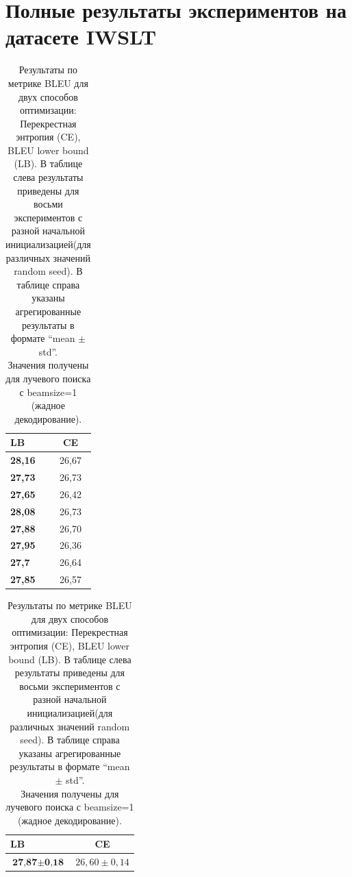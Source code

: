 \documentclass[14pt, a4paper]{extarticle}
\begin{document}
\section{Полные результаты экспериментов на датасете IWSLT}
\begin{table}[!htbp]
\begin{tabular}{| l  c |}
\hline \bf LB & \bf CE\\
\hline
\bf 28,16 & 26,67\\
\bf 27,73 & 26,73\\
\bf 27,65 & 26,42\\
\bf 28,08 & 26,73\\
\bf 27,88 & 26,70\\
\bf 27,95 & 26,36\\
\bf 27,7  & 26,64\\
\bf 27,85 & 26,57\\
\hline
\end{tabular}
\quad \quad \quad \quad \quad \quad \quad \quad \quad \quad \quad
\begin{tabular}{| l  c |}
  \hline \bf LB & \bf CE\\
  \hline
  $\textbf{27,87}\pm \textbf{0,18}$ & $26,60\pm 0,14$\\
  \hline
  \end{tabular}
  \caption{Результаты по метрике BLEU для двух способов оптимизации: Перекрестная энтропия (CE), BLEU lower bound (LB).
           В таблице слева результаты приведены для восьми экспериментов с разной начальной инициализацией(для различных значений random seed).
           В таблице справа указаны агрегированные результаты в формате ``mean $\pm$ std''.\\
           Значения получены для лучевого поиска с beamsize=1 (жадное декодирование).}
\end{table}
\end{document}
